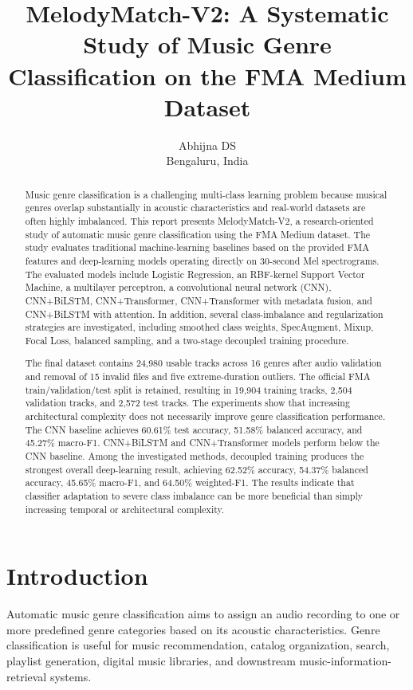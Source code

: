 \documentclass[11pt,a4paper]{article}
\title{\textbf{MelodyMatch-V2: A Systematic Study of Music Genre Classification on the FMA Medium Dataset}}
\author{
Abhijna DS\\
Bengaluru, India
}
\date{}
\begin{document}
\maketitle

\begin{abstract}
Music genre classification is a challenging multi-class learning problem because musical genres overlap substantially in acoustic characteristics and real-world datasets are often highly imbalanced. This report presents MelodyMatch-V2, a research-oriented study of automatic music genre classification using the FMA Medium dataset. The study evaluates traditional machine-learning baselines based on the provided FMA features and deep-learning models operating directly on 30-second Mel spectrograms. The evaluated models include Logistic Regression, an RBF-kernel Support Vector Machine, a multilayer perceptron, a convolutional neural network (CNN), CNN+BiLSTM, CNN+Transformer, CNN+Transformer with metadata fusion, and CNN+BiLSTM with attention. In addition, several class-imbalance and regularization strategies are investigated, including smoothed class weights, SpecAugment, Mixup, Focal Loss, balanced sampling, and a two-stage decoupled training procedure.

The final dataset contains 24,980 usable tracks across 16 genres after audio validation and removal of 15 invalid files and five extreme-duration outliers. The official FMA train/validation/test split is retained, resulting in 19,904 training tracks, 2,504 validation tracks, and 2,572 test tracks. The experiments show that increasing architectural complexity does not necessarily improve genre classification performance. The CNN baseline achieves 60.61\% test accuracy, 51.58\% balanced accuracy, and 45.27\% macro-F1. CNN+BiLSTM and CNN+Transformer models perform below the CNN baseline. Among the investigated methods, decoupled training produces the strongest overall deep-learning result, achieving 62.52\% accuracy, 54.37\% balanced accuracy, 45.65\% macro-F1, and 64.50\% weighted-F1. The results indicate that classifier adaptation to severe class imbalance can be more beneficial than simply increasing temporal or architectural complexity.
\end{abstract}

\section{Introduction}

Automatic music genre classification aims to assign an audio recording to one or more predefined genre categories based on its acoustic characteristics. Genre classification is useful for music recommendation, catalog organization, search, playlist generation, digital music libraries, and downstream music-information-retrieval systems.
\end{document}
